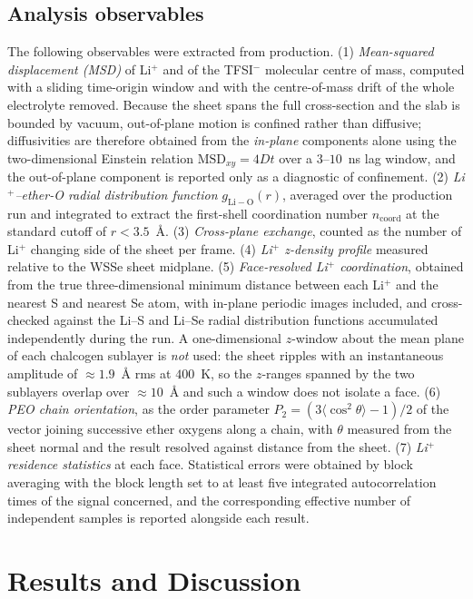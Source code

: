 \documentclass[review, 12pt]{elsarticle}
\numberwithin{equation}{section}
\newcommand{\WSSe}{WSSe\xspace}
\begin{document}
\subsection{Analysis observables}
The following observables were extracted from production.
(1) \textit{Mean-squared displacement (MSD)} of Li$^+$ and of the TFSI$^-$ molecular centre of mass, computed with a sliding time-origin window and with the centre-of-mass drift of the whole electrolyte removed. Because the sheet spans the full cross-section and the slab is bounded by vacuum, out-of-plane motion is confined rather than diffusive; diffusivities are therefore obtained from the \emph{in-plane} components alone using the two-dimensional Einstein relation $\mathrm{MSD}_{xy} = 4Dt$ over a $3$--$10$~ns lag window, and the out-of-plane component is reported only as a diagnostic of confinement.
(2) \textit{Li$^+$--ether-O radial distribution function} $g_{\mathrm{Li-O}}(r)$, averaged over the production run and integrated to extract the first-shell coordination number $n_{\mathrm{coord}}$ at the standard cutoff of $r < 3.5$~\AA.
(3) \textit{Cross-plane exchange}, counted as the number of Li$^+$ changing side of the sheet per frame.
(4) \textit{Li$^+$ z-density profile} measured relative to the \WSSe sheet midplane.
(5) \textit{Face-resolved Li$^+$ coordination}, obtained from the true three-dimensional minimum distance between each Li$^+$ and the nearest S and nearest Se atom, with in-plane periodic images included, and cross-checked against the Li--S and Li--Se radial distribution functions accumulated independently during the run. A one-dimensional $z$-window about the mean plane of each chalcogen sublayer is \emph{not} used: the sheet ripples with an instantaneous amplitude of $\approx1.9$~\AA{} rms at $400$~K, so the $z$-ranges spanned by the two sublayers overlap over $\approx10$~\AA{} and such a window does not isolate a face.
(6) \textit{PEO chain orientation}, as the order parameter $P_2 = (3\langle\cos^2\theta\rangle-1)/2$ of the vector joining successive ether oxygens along a chain, with $\theta$ measured from the sheet normal and the result resolved against distance from the sheet.
(7) \textit{Li$^+$ residence statistics} at each face.
Statistical errors were obtained by block averaging with the block length set to at least five integrated autocorrelation times of the signal concerned, and the corresponding effective number of independent samples is reported alongside each result.

\section{Results and Discussion}\label{sec:results}
\end{document}
